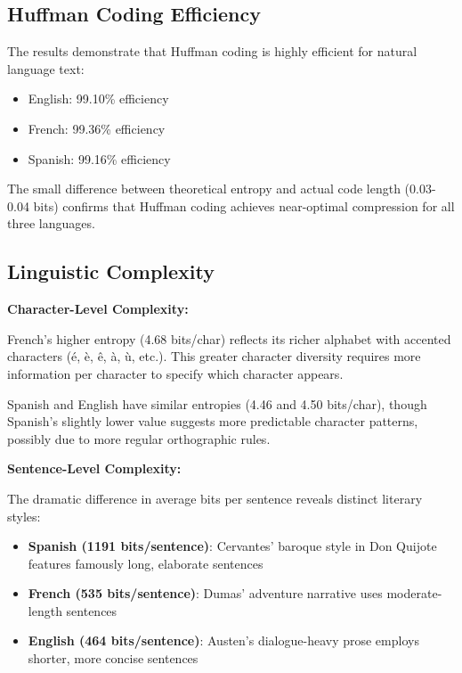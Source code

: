 \documentclass[11pt,a4paper]{article}
\begin{document}
\subsection{Huffman Coding Efficiency}

The results demonstrate that Huffman coding is highly efficient for natural language text:

\begin{itemize}
    \item English: 99.10\% efficiency
    \item French: 99.36\% efficiency
    \item Spanish: 99.16\% efficiency
\end{itemize}

The small difference between theoretical entropy and actual code length (0.03-0.04 bits) confirms that Huffman coding achieves near-optimal compression for all three languages.

\subsection{Linguistic Complexity}

\textbf{Character-Level Complexity:}

French's higher entropy (4.68 bits/char) reflects its richer alphabet with accented characters (é, è, ê, à, ù, etc.). This greater character diversity requires more information per character to specify which character appears.

Spanish and English have similar entropies (4.46 and 4.50 bits/char), though Spanish's slightly lower value suggests more predictable character patterns, possibly due to more regular orthographic rules.

\textbf{Sentence-Level Complexity:}

The dramatic difference in average bits per sentence reveals distinct literary styles:

\begin{itemize}
    \item \textbf{Spanish (1191 bits/sentence)}: Cervantes' baroque style in Don Quijote features famously long, elaborate sentences
    \item \textbf{French (535 bits/sentence)}: Dumas' adventure narrative uses moderate-length sentences
    \item \textbf{English (464 bits/sentence)}: Austen's dialogue-heavy prose employs shorter, more concise sentences
\end{itemize}
\end{document}
